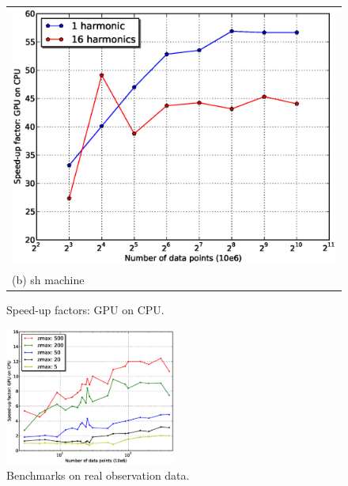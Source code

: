 \documentclass[preprint2]{aastex}
\begin{document}
\begin{figure}
  \begin{tabular}[b]{@{}p{}@{}}
    \centering\includegraphics[width=1.0\linewidth]{fig/sh_machine_speed_up.eps} \\
    \centering\small (b) sh machine
  \end{tabular}
\caption{Speed-up factors: GPU on CPU.}
\label{fig:numharm_effect}
\end{figure}

\begin{figure}
\centering
\includegraphics[width=0.5\textwidth]{fig/Terzan5_s000m_8_harm_makalu.eps}
\caption{Benchmarks on real observation data.}
\label{fig:Terzan5_8_harm}
\end{figure}

\end{document}
